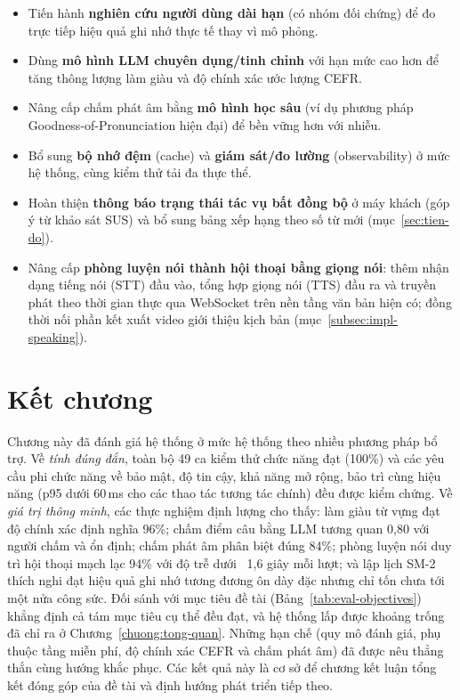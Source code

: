 \begin{itemize}
  \item Tiến hành \textbf{nghiên cứu người dùng dài hạn} (có nhóm đối chứng)
        để đo trực tiếp hiệu quả ghi nhớ thực tế thay vì mô phỏng.
  \item Dùng \textbf{mô hình LLM chuyên dụng/tinh chỉnh} với hạn mức cao hơn
        để tăng thông lượng làm giàu và độ chính xác ước lượng CEFR.
  \item Nâng cấp chấm phát âm bằng \textbf{mô hình học sâu} (ví dụ phương pháp
        Goodness-of-Pronunciation hiện đại) để bền vững hơn với nhiễu.
  \item Bổ sung \textbf{bộ nhớ đệm} (cache) và \textbf{giám sát/đo lường}
        (observability) ở mức hệ thống, cùng kiểm thử tải đa thực thể.
  \item Hoàn thiện \textbf{thông báo trạng thái tác vụ bất đồng bộ} ở máy khách
        (góp ý từ khảo sát SUS) và bổ sung bảng xếp hạng theo số từ mới
        (mục~\ref{sec:tien-do}).
  \item Nâng cấp \textbf{phòng luyện nói thành hội thoại bằng giọng nói}: thêm
        nhận dạng tiếng nói (STT) đầu vào, tổng hợp giọng nói (TTS) đầu ra và
        truyền phát theo thời gian thực qua WebSocket trên nền tầng văn bản hiện
        có; đồng thời nối phần kết xuất video giới thiệu kịch bản
        (mục~\ref{subsec:impl-speaking}).
\end{itemize}

\section{Kết chương}
\label{sec:ket-chuong-5}

Chương này đã đánh giá hệ thống ở mức hệ thống theo nhiều phương pháp bổ trợ.
Về \textit{tính đúng đắn}, toàn bộ 49 ca kiểm thử chức năng đạt (100\%) và các
yêu cầu phi chức năng về bảo mật, độ tin cậy, khả năng mở rộng, bảo trì cùng
hiệu năng (p95 dưới 60\,ms cho các thao tác tương tác chính) đều được kiểm
chứng. Về \textit{giá trị thông minh}, các thực nghiệm định lượng cho thấy:
làm giàu từ vựng đạt độ chính xác định nghĩa 96\%; chấm điểm câu bằng LLM tương
quan 0,80 với người chấm và ổn định; chấm phát âm phân biệt đúng 84\%; phòng
luyện nói duy trì hội thoại mạch lạc 94\% với độ trễ dưới ~1,6 giây mỗi lượt;
và lập lịch SM-2 thích nghi đạt hiệu quả ghi nhớ tương đương ôn dày đặc nhưng
chỉ tốn chưa tới một nửa công sức. Đối sánh với mục tiêu đề tài
(Bảng~\ref{tab:eval-objectives}) khẳng định cả tám mục tiêu cụ thể đều đạt, và
hệ thống lấp được khoảng trống đã chỉ ra ở Chương~\ref{chuong:tong-quan}.
Những hạn chế (quy mô đánh giá, phụ thuộc tầng miễn phí, độ chính xác CEFR và
chấm phát âm) đã được nêu thẳng thắn cùng hướng khắc phục. Các kết quả này là
cơ sở để chương kết luận tổng kết đóng góp của đề tài và định hướng phát triển
tiếp theo.
